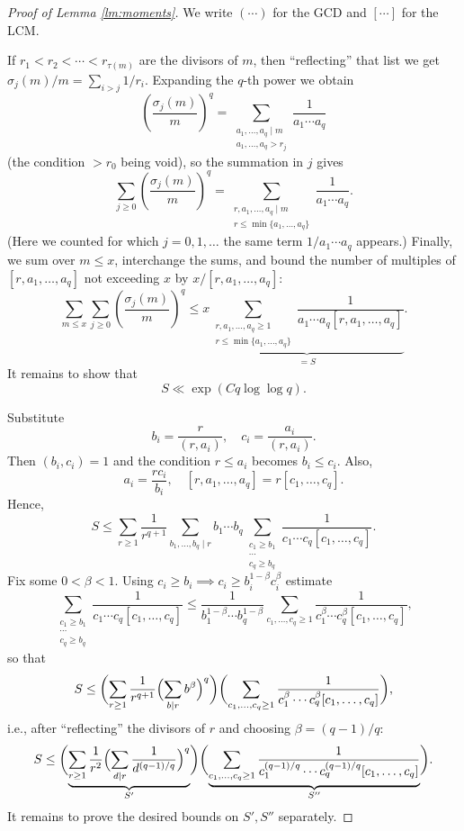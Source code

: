 \begin{proof}[Proof of Lemma \ref{lm:moments}]
We write $(\cdots)$ for the GCD and $[\cdots]$ for the LCM.

If $r_1<r_2<\cdots<r_{\tau(m)}$ are the divisors of $m$, then ``reflecting'' that list we get $\sigma_j(m)/m=\sum_{i>j}1/r_i$. Expanding the $q$-th power we obtain
\[ \left(\frac{\sigma_j(m)}{m}\right)^q =
\sum_{\substack{a_1,\ldots,a_q\mid m\\ a_1,\ldots,a_q> r_j}} \frac1{a_1\cdots a_q} \]
(the condition $>r_0$ being void), so the summation in $j$ gives
\[ \sum_{j\geq 0} \left(\frac{\sigma_j(m)}{m}\right)^q
= \sum_{\substack{r,a_1,\ldots,a_q\mid m\\ r\leq \min\{a_1,\ldots,a_q\}}} \frac1{a_1\cdots a_q}. \]
(Here we counted for which $j=0,1,\ldots$ the same term $1/a_1\cdots a_q$ appears.)
Finally, we sum over $m\leq x$, interchange the sums, and bound the number of
multiples of $[r,a_1,\ldots,a_q]$ not exceeding $x$ by $x/[r,a_1,\ldots,a_q]$:
\[ \sum_{m\leq x} \sum_{j\geq 0} \left(\frac{\sigma_j(m)}{m}\right)^q
\leq x \underbrace{\sum_{\substack{r,a_1,\ldots,a_q\geq 1\\ r\leq \min\{a_1,\ldots,a_q\}}} \frac1{a_1\cdots a_q [r,a_1,\ldots,a_q]}}_{=S}. \]
It remains to show that
\begin{equation}\label{eq:Sbound}
S\ll \exp(C q\log\log q).
\end{equation}

Substitute
\[ b_i=\frac{r}{(r,a_i)},\quad c_i=\frac{a_i}{(r,a_i)}. \]
Then $(b_i,c_i)=1$ and the condition $r\leq a_i$ becomes $b_i\leq c_i$. 
Also,
\[ a_i=\frac{r c_i}{b_i}, \quad [r,a_1,\ldots,a_q]=r[c_1,\ldots,c_q]. \]
Hence,
\[ S \leq
\sum_{r\geq 1}\frac{1}{r^{q+1}}
\sum_{b_1,\ldots,b_q\mid r} b_1\cdots b_q
\sum_{\substack{c_1\geq b_1\\ \cdots\\ c_q\geq b_q}}
\frac{1}{c_1\cdots c_q [c_1,\ldots,c_q]}. \]
Fix some $0<\beta<1$. Using $c_i\geq b_i\implies c_i \geq b_i^{1-\beta} c_i^\beta$ estimate
\[ \sum_{\substack{c_1\geq b_1\\ \cdots\\ c_q\geq b_q}}
\frac{1}{c_1\cdots c_q [c_1,\ldots,c_q]}
\leq \frac{1}{b_1^{1-\beta}\cdots b_q^{1-\beta}} \sum_{c_1,\ldots,c_q\geq1} \frac{1}{c_1^\beta\cdots c_q^\beta [c_1,\ldots,c_q]}, \]
so that
\[ S \leq \biggl( \sum_{r\geq 1}\frac1{r^{q+1}} \Bigl(\sum_{b\mid r} b^{\beta}\Bigr)^q \biggr)
\biggl( \sum_{c_1,\ldots,c_q\geq1} \frac{1}{c_1^\beta\cdots c_q^\beta [c_1,\ldots,c_q]} \biggr), \]
i.e., after ``reflecting'' the divisors of $r$ and choosing $\beta=(q-1)/q$:
\[ S \leq 
\biggl( \underbrace{\sum_{r\geq 1}\frac1{r^2} \Bigl(\sum_{d\mid r} \frac{1}{d^{(q-1)/q}}\Bigr)^q}_{S'} \biggr)
\biggl( \underbrace{\sum_{c_1,\ldots,c_q\geq1} \frac{1}{c_1^{(q-1)/q}\cdots c_q^{(q-1)/q} [c_1,\ldots,c_q]}}_{S''} \biggr). \]
It remains to prove the desired bounds on $S',S''$ separately.


\end{proof}
